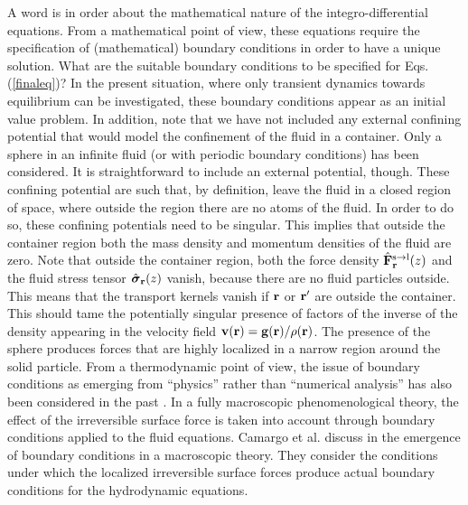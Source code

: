 \documentclass[b5paper,openright,11pt]{book}
\begin{document}
A   word  is   in  order   about  the   mathematical  nature   of  the
integro-differential equations.   From a  mathematical point  of view,
these equations  require the specification of  (mathematical) boundary
conditions in order  to have a unique solution. What  are the suitable
boundary conditions to be specified for Eqs.  (\ref{finaleq})?  In the
present situation,  where only transient dynamics  towards equilibrium
can be  investigated, these boundary  conditions appear as  an initial
value  problem.  In  addition,  note  that we  have  not included  any
external confining potential that would model the  confinement of the fluid in a
container.   Only a  sphere in  an  infinite fluid  (or with  periodic
boundary conditions)  has been  considered.  It is  straightforward to
include an external potential,  though.  These confining potential are
such that, by definition, leave the fluid in a closed region of space,
where outside the region there are no atoms of the fluid.  In order to
do so, these  confining potentials need to be  singular.  This implies
that outside the  container region both the mass  density and momentum
densities of the fluid are zero.
Note that outside the  container region, both
the force density $\hat{\bf F}_{\bf  r}^{\rm s\to l}(z)$ and the fluid
stress tensor  $\hat{\boldsymbol{\sigma}}_{\bf r}(z)$  vanish, because
there are  no fluid particles  outside. This means that  the transport
kernels vanish if  ${\bf r}$ or ${\bf r}'$ are  outside the container.
This should tame  the potentially singular presence of  factors of the
inverse of the  density appearing in the velocity  field ${\bf v}({\bf
  r})={\bf  g}({\bf r})/\rho({\bf  r})$.  The  presence of  the sphere
produces forces  that are highly  localized in a narrow  region around
the solid particle.  From a thermodynamic  point of view, the issue of
boundary  conditions   as  emerging   from  ``physics''   rather  than
``numerical  analysis''   has  also   been  considered  in   the  past
\cite{Bedeaux1976,Qian2008,Ottinger2008,Sagis2011}.    In    a   fully
macroscopic phenomenological  theory, the  effect of  the irreversible
surface  force  is  taken  into account  through  boundary  conditions
applied  to  the fluid  equations.  Camargo et al. discuss in \cite{CamargoBC2018} 
the emergence  of  boundary conditions  in a  macroscopic
theory.  They  consider the  conditions  under  which  the
localized   irreversible  surface   forces  produce   actual  boundary
conditions for the hydrodynamic equations.
\end{document}
